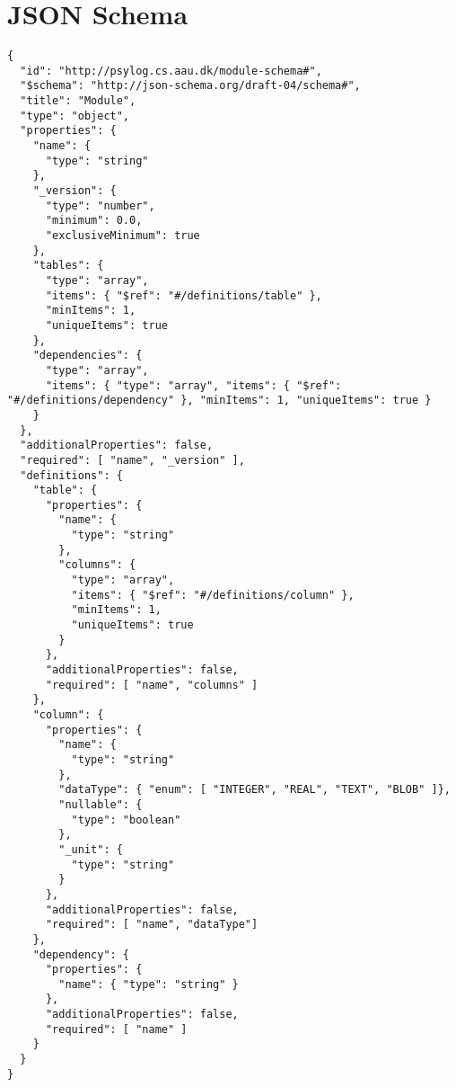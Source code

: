 \chapter{JSON Schema}\label{app:json_schema}
\begin{lstlisting}
{
  "id": "http://psylog.cs.aau.dk/module-schema#",
  "$schema": "http://json-schema.org/draft-04/schema#",
  "title": "Module",
  "type": "object",
  "properties": {
    "name": {
      "type": "string"
    },
    "_version": {
      "type": "number",
      "minimum": 0.0,
      "exclusiveMinimum": true
    },
    "tables": {
      "type": "array",
      "items": { "$ref": "#/definitions/table" },
      "minItems": 1,
      "uniqueItems": true
    },
    "dependencies": {
      "type": "array",
      "items": { "type": "array", "items": { "$ref": "#/definitions/dependency" }, "minItems": 1, "uniqueItems": true }
    }
  },
  "additionalProperties": false,
  "required": [ "name", "_version" ],
  "definitions": {
    "table": {
      "properties": {
        "name": {
          "type": "string"
        },
        "columns": {
          "type": "array",
          "items": { "$ref": "#/definitions/column" },
          "minItems": 1,
          "uniqueItems": true
        }
      },
      "additionalProperties": false,
      "required": [ "name", "columns" ]
    },
    "column": {
      "properties": {
        "name": {
          "type": "string"
        },
        "dataType": { "enum": [ "INTEGER", "REAL", "TEXT", "BLOB" ]},
        "nullable": {
          "type": "boolean"
        },
        "_unit": {
          "type": "string"
        }
      },
      "additionalProperties": false,
      "required": [ "name", "dataType"]
    },
    "dependency": {
      "properties": {
        "name": { "type": "string" }
      },
      "additionalProperties": false,
      "required": [ "name" ]
    }
  }
}
\end{lstlisting}